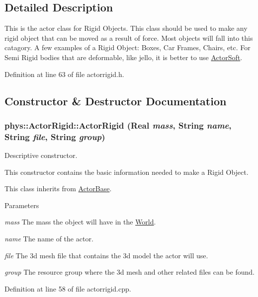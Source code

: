 \subsection{Detailed Description}
This is the actor class for Rigid Objects. This class should be used to make any rigid object that can be moved as a result of force. Most objects will fall into this catagory. A few examples of a Rigid Object: Boxes, Car Frames, Chairs, etc. For Semi Rigid bodies that are deformable, like jello, it is better to use \hyperlink{classphys_1_1ActorSoft}{ActorSoft}. 

Definition at line 63 of file actorrigid.h.



\subsection{Constructor \& Destructor Documentation}
\hypertarget{classphys_1_1ActorRigid_abc5fd9a4ef92dddc4c640b6642994da1}{
\subsubsection[{ActorRigid}]{\setlength{\rightskip}{0pt plus 5cm}phys::ActorRigid::ActorRigid ({\bf Real} {\em mass}, \/  {\bf String} {\em name}, \/  {\bf String} {\em file}, \/  {\bf String} {\em group})}}
\label{d8/d71/classphys_1_1ActorRigid_abc5fd9a4ef92dddc4c640b6642994da1}


Descriptive constructor. 

This constructor contains the basic information needed to make a Rigid Object. \par
 This class inherits from \hyperlink{classphys_1_1ActorBase}{ActorBase}. 
\begin{DoxyParams}{Parameters}
\item[{\em mass}]The mass the object will have in the \hyperlink{classphys_1_1World}{World}. \item[{\em name}]The name of the actor. \item[{\em file}]The 3d mesh file that contains the 3d model the actor will use. \item[{\em group}]The resource group where the 3d mesh and other related files can be found. \end{DoxyParams}


Definition at line 58 of file actorrigid.cpp.

